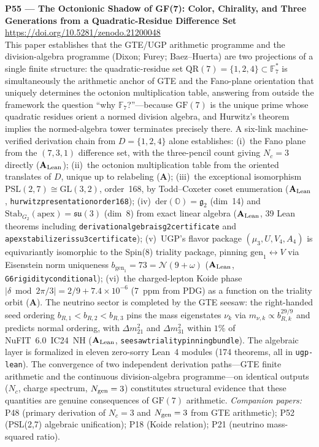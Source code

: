 \documentclass[11pt]{article}
\newcommand{\lean}[1]{%
  \penalty-100
  \begingroup\def\_{{\textunderscore\allowbreak}}\texttt{#1}\endgroup}
\newcommand{\CatAL}{\ensuremath{\textbf{A}_{\rm Lean}}}
\newcommand{\CatA}{\textbf{A}}
\begin{document}
\medskip
\noindent\textbf{P55 --- The Octonionic Shadow of GF(7): Color, Chirality, and Three
Generations from a Quadratic-Residue Difference Set}~\cite{SpivackOctonionicShadow}\\
\url{https://doi.org/10.5281/zenodo.21200048}\\
This paper establishes that the GTE/UGP arithmetic programme and the
division-algebra programme (Dixon; Furey; Baez--Huerta) are two projections of a
single finite structure: the quadratic-residue set $\mathrm{QR}(7) = \{1,2,4\}
\subset \mathbb{F}_7^*$ is simultaneously the arithmetic anchor of GTE and the
Fano-plane orientation that uniquely determines the octonion multiplication table,
answering from outside the framework the question ``why $\mathbb{F}_7$?''---because
$\mathrm{GF}(7)$ is the unique prime whose quadratic residues orient a normed
division algebra, and Hurwitz's theorem implies the normed-algebra tower terminates
precisely there.
A six-link machine-verified derivation chain from $D = \{1,2,4\}$ alone establishes:
(i)~the Fano plane from the $(7,3,1)$ difference set, with the three-pencil count
giving $N_c = 3$ directly (\CatAL);
(ii)~the octonion multiplication table from the oriented translates of $D$, unique
up to relabeling (\CatA);
(iii)~the exceptional isomorphism $\mathrm{PSL}(2,7)\cong\mathrm{GL}(3,2)$, order~168,
by Todd--Coxeter coset enumeration (\CatAL,
\lean{hurwitz\_presentation\_order\_168});
(iv)~$\mathrm{der}(\mathbb{O}) = \mathfrak{g}_2$ (dim~14) and
$\mathrm{Stab}_{G_2}(\mathrm{apex}) = \mathfrak{su}(3)$ (dim~8) from exact linear
algebra (\CatAL, 39 Lean theorems including
\lean{derivation\_algebra\_is\_g2\_certificate} and
\lean{apex\_stabilizer\_is\_su3\_certificate});
(v)~UGP's flavor package $(\mu_3, U, V_4, A_4)$ is equivariantly isomorphic to the
Spin(8) triality package, pinning $\mathrm{gen}_1\leftrightarrow V$ via
Eisenstein norm uniqueness $b_{\mathrm{gen}_1}=73=\mathcal{N}(9+\omega)$
(\CatAL, \lean{G6\_rigidity\_conditional});
(vi)~the charged-lepton Koide phase $|\delta\bmod 2\pi/3| = 2/9 + 7.4\times10^{-6}$
(7~ppm from PDG) as a function on the triality orbit (\CatA).
The neutrino sector is completed by the GTE seesaw: the right-handed seed ordering
$b_{R,1}<b_{R,2}<b_{R,3}$ pins the mass eigenstates $\nu_k$ via
$m_{\nu,k}\propto b_{R,k}^{29/9}$ and predicts normal ordering, with
$\Delta m^2_{21}$ and $\Delta m^2_{31}$ within $1\%$ of NuFIT~6.0~IC24~NH
(\CatAL, \lean{seesaw\_triality\_pinning\_bundle}).
The algebraic layer is formalized in eleven zero-sorry Lean~4 modules (174 theorems,
all in \texttt{ugp-lean}).
The convergence of two independent derivation paths---GTE finite arithmetic and
the continuous division-algebra programme---on identical outputs ($N_c$, charge
spectrum, $N_{\rm gen}=3$) constitutes structural evidence that these quantities
are genuine consequences of $\mathrm{GF}(7)$ arithmetic.
\emph{Companion papers:} P48 (primary derivation of $N_c=3$ and $N_{\rm gen}=3$ from
GTE arithmetic); P52 (PSL(2,7) algebraic unification); P18 (Koide relation);
P21 (neutrino mass-squared ratio).
\end{document}

